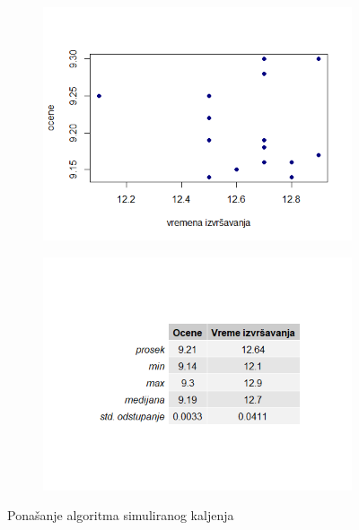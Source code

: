 \documentclass[a4paper]{article}
\begin{document}
\begin{figure}[H]
\begin{subfigure}{0.49\textwidth}
    \includegraphics[width = \textwidth]{img/kaljenje_plot.png}
    \end{subfigure}
    \hfill
    \begin{subfigure}{0.49\textwidth}
    \includegraphics[width = \textwidth]{img/kaljenje_tabela.png}
    \end{subfigure}
    \caption{Ponašanje algoritma simuliranog kaljenja}
    \label{fig:my_label}
\end{figure}

\begin{figure}[H]

\end{figure}
\end{document}
